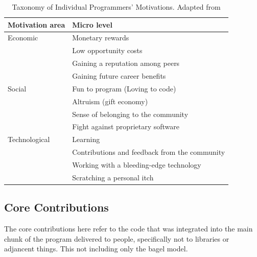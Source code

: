 \begin{table}
    \begin{tabularx}{\textwidth}{l l} 
    \toprule
    Motivation area & Micro level \\
    \midrule
    Economic & Monetary rewards \\
     & Low opportunity costs \\
     & Gaining a reputation among peers \\
     & Gaining future career benefits \\
    \midrule
    Social & Fun to program (Loving to code) \\
     & Altruism (gift economy) \\
     & Sense of belonging to the community \\
     & Fight against proprietary software \\
    \midrule
    Technological & Learning \\
     & Contributions and feedback from the community \\
     & Working with a bleeding-edge technology \\
     & Scratching a personal itch \\
    \bottomrule
    \end{tabularx} 
    \caption{Taxonomy of Individual Programmers’ Motivations. Adapted from \parencite{bonaccorsiComparingMotivationsIndividual2006}}
    \label{tab:taxonomy}

\end{table}

\subsection{Core Contributions}
The core contributions here refer to the code that was integrated into the main chunk of the program delivered to people, specifically not to libraries or adjancent things. This not including only the bagel model.

